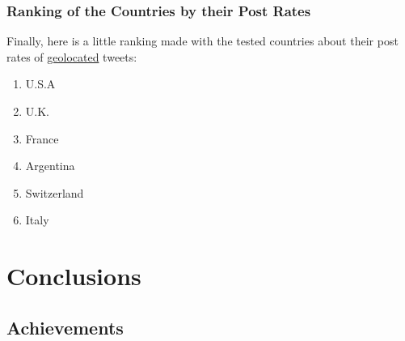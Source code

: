 \documentclass[a4paper,11pt]{report}
\begin{document}
\subsection{Ranking of the Countries by their Post Rates}
Finally, here is a little ranking made with the tested countries about their post rates of \underline{geolocated} tweets:
\begin{enumerate}
	\item U.S.A
	\item U.K.
	\item France
	\item Argentina
	\item Switzerland
	\item Italy
\end{enumerate}


\chapter{Conclusions}
\section{Achievements}
\end{document}
